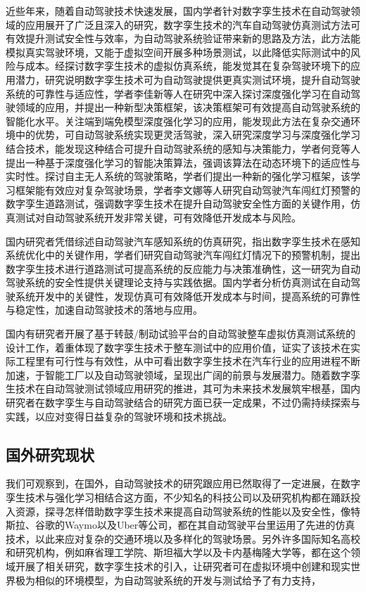 近些年来，随着自动驾驶技术快速发展，国内学者针对数字孪生技术在自动驾驶领域的应用展开了广泛且深入的研究，数字孪生技术的汽车自动驾驶仿真测试方法可有效提升测试安全性与效率，为自动驾驶系统验证带来新的思路及方法，此方法能模拟真实驾驶环境，又能于虚拟空间开展多种场景测试，以此降低实际测试中的风险与成本\cite{文谢2023基于数字孪生的汽车自动驾驶仿真测试方法}。经探讨数字孪生技术的虚拟仿真系统，能发觉其在复杂驾驶环境下的应用潜力，研究说明数字孪生技术可为自动驾驶提供更真实测试环境，提升自动驾驶系统的可靠性与适应性\cite{彭博2023基于数字孪生的虚拟仿真系统研究与应用}，学者李佳新等人在研究中深入探讨深度强化学习在自动驾驶领域的应用，并提出一种新型决策框架，该决策框架可有效提高自动驾驶系统的智能化水平。关注端到端免模型深度强化学习的应用，能发现此方法在复杂交通环境中的优势，可自动驾驶系统实现更灵活驾驶，深入研究深度学习与深度强化学习结合技术，能发现这种结合可提升自动驾驶系统的感知与决策能力，学者何竞等人提出一种基于深度强化学习的智能决策算法，强调该算法在动态环境下的适应性与实时性。探讨自主无人系统的驾驶策略，学者们提出一种新的强化学习框架，该学习框架能有效应对复杂驾驶场景，学者李文娜\cite{李文娜2024自动驾驶汽车闯红灯预警数字孪生道路测试}等人研究自动驾驶汽车闯红灯预警的数字孪生道路测试，强调数字孪生技术在提升自动驾驶安全性方面的关键作用，仿真测试对自动驾驶系统开发非常关键，可有效降低开发成本与风险。

国内研究者凭借综述自动驾驶汽车感知系统的仿真研究，指出数字孪生技术在感知系统优化中的关键作用，学者们研究自动驾驶汽车闯红灯情况下的预警机制，提出数字孪生技术进行道路测试可提高系统的反应能力与决策准确性，这一研究为自动驾驶系统的安全性提供关键理论支持与实践依据。国内学者分析仿真测试在自动驾驶系统开发中的关键性，发现仿真可有效降低开发成本与时间，提高系统的可靠性与稳定性，加速自动驾驶技术的落地与应用\cite{杨海清2024仿真测试在自动驾驶系统开发中的重要性}。

国内有研究者开展了基于转鼓/制动试验平台的自动驾驶整车虚拟仿真测试系统\cite{田常青2024基于转鼓}的设计工作，着重体现了数字孪生技术于整车测试中的应用价值，证实了该技术在实际工程里有可行性与有效性，从中可看出数字孪生技术在汽车行业的应用进程不断加速，于智能工厂以及自动驾驶领域，呈现出广阔的前景与发展潜力\cite{高驰2023智能工厂}。随着数字孪生技术在自动驾驶测试领域应用研究的推进，其可为未来技术发展筑牢根基，国内研究者在数字孪生与自动驾驶结合的研究方面已获一定成果，不过仍需持续探索与实践，以应对变得日益复杂的驾驶环境和技术挑战。

\subsection{国外研究现状}
我们可观察到，在国外，自动驾驶技术的研究跟应用已然取得了一定进展，在数字孪生技术与强化学习相结合这方面，不少知名的科技公司以及研究机构都在踊跃投入资源，探寻怎样借助数字孪生技术来提高自动驾驶系统的性能以及安全性，像特斯拉、谷歌的Waymo以及Uber等公司，都在其自动驾驶平台里运用了先进的仿真技术，以此来应对复杂的交通环境以及多样化的驾驶场景。另外许多国际知名高校和研究机构，例如麻省理工学院、斯坦福大学以及卡内基梅隆大学等，都在这个领域开展了相关研究，数字孪生技术的引入，让研究者可在虚拟环境中创建和现实世界极为相似的环境模型，为自动驾驶系统的开发与测试给予了有力支持，

